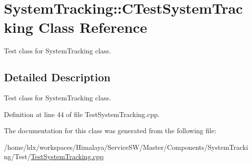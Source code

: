 \hypertarget{classSystemTracking_1_1CTestSystemTracking}{\section{\-System\-Tracking\-:\-:\-C\-Test\-System\-Tracking \-Class \-Reference}
\label{classSystemTracking_1_1CTestSystemTracking}
}


\-Test class for \-System\-Tracking class.  




\subsection{\-Detailed \-Description}
\-Test class for \-System\-Tracking class. 

\-Definition at line 44 of file \-Test\-System\-Tracking.\-cpp.



\-The documentation for this class was generated from the following file\-:\begin{DoxyCompactItemize}
\item 
/home/ldx/workspaces/\-Himalaya/\-Service\-S\-W/\-Master/\-Components/\-System\-Tracking/\-Test/\hyperlink{TestSystemTracking_8cpp}{\-Test\-System\-Tracking.\-cpp}\end{DoxyCompactItemize}
